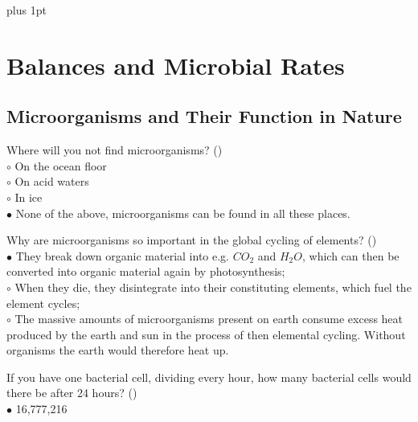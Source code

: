 \documentclass[]{beamer}
\begin{document}
\parskip=1cm plus 1pt
\section{Balances and Microbial Rates}

\subsection{Microorganisms and Their Function in Nature}
\setcounter{answers}{0}
\begin{frame}[shrink] {}
\addtocounter{answers}{1}
\color{blue}
Where will you not find microorganisms? ()\\
\color{black}
\setlength{\parindent}{-0.4cm}
{\color{red}$\circ$} On the ocean floor \\
{\color{red}$\circ$} On acid waters  \\
{\color{red}$\circ$} In ice  \\
{\color{red}$\bullet$} None of the above, microorganisms can be found in all these places. \\
\end{frame}

\begin{frame}[shrink] {}
\addtocounter{answers}{1}
\color{blue}
Why are microorganisms so important in the global cycling of elements? ()\\
\color{black}
\setlength{\parindent}{-0.4cm}
{\color{red}$\bullet$} They break down organic material into e.g. $CO_2$ and $H_2O$, which can
then be converted into organic material again by photosynthesis;\\
{\color{red}$\circ$} When they die, they disintegrate into their constituting elements,
which fuel the element cycles;\\
{\color{red}$\circ$} The massive amounts of microorganisms present on earth
consume excess heat produced by the earth and sun in the process of
then elemental cycling. Without organisms the earth would therefore heat up.
\end{frame}

\begin{frame}[shrink] {}
\addtocounter{answers}{1}
\color{blue}
If you have one bacterial cell, dividing every hour, how many bacterial
cells would there be after 24 hours? ()\\
\color{black}
\setlength{\parindent}{-0.4cm}
{\color{red}$\bullet$} 16,777,216
\end{frame}
\end{document}
